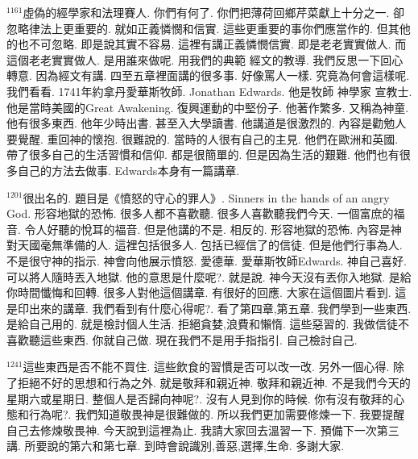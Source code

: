 \documentclass{book}
\begin{document}
$^{1161}$虛偽的經學家和法理賽人.
你們有何了.
你們把薄荷回鄉芹菜獻上十分之一.
卻忽略律法上更重要的.
就如正義憐憫和信實.
這些更重要的事你們應當作的.
但其他的也不可忽略.
即是說其實不容易.
這裡有講正義憐憫信實.
即是老老實實做人.
而這個老老實實做人.
是用誰來做呢.
用我們的典範 經文的教導.
我們反思一下回心轉意.
因為經文有講.
四至五章裡面講的很多事.
好像罵人一樣.
究竟為何會這樣呢.
我們看看.
1741年約拿丹愛華斯牧師.
Jonathan Edwards.
他是牧師 神學家 宣教士.
他是當時美國的Great Awakening.
復興運動的中堅份子.
他著作繁多.
又稱為神童.
他有很多東西.
他年少時出書.
甚至入大學讀書.
他講道是很激烈的.
內容是勸勉人要覺醒.
重回神的懷抱.
很難說的.
當時的人很有自己的主見.
他們在歐洲和英國.
帶了很多自己的生活習慣和信仰.
都是很簡單的.
但是因為生活的艱難.
他們也有很多自己的方法去做事.
Edwards本身有一篇講章.

$^{1201}$很出名的.
題目是《憤怒的守心的罪人》.
Sinners in the hands of an angry God.
形容地獄的恐怖.
很多人都不喜歡聽.
很多人喜歡聽我們今天.
一個富庶的福音.
令人好聽的悅耳的福音.
但是他講的不是.
相反的.
形容地獄的恐怖.
內容是神對天國毫無準備的人.
這裡包括很多人.
包括已經信了的信徒.
但是他們行事為人.
不是很守神的指示.
神會向他展示憤怒.
愛德華.
愛華斯牧師Edwards.
神自己喜好.
可以將人隨時丟入地獄.
他的意思是什麼呢?.
就是說.
神今天沒有丟你入地獄.
是給你時間懺悔和回轉.
很多人對他這個講章.
有很好的回應.
大家在這個圖片看到.
這是印出來的講章.
我們看到有什麼心得呢?.
看了第四章,第五章.
我們學到一些東西.
是給自己用的.
就是檢討個人生活.
拒絕貪婪,浪費和懶惰.
這些惡習的.
我做信徒不喜歡聽這些東西.
你就自己做.
現在我們不是用手指指引.
自己檢討自己.

$^{1241}$這些東西是否不能不買住.
這些飲食的習慣是否可以改一改.
另外一個心得.
除了拒絕不好的思想和行為之外.
就是敬拜和親近神.
敬拜和親近神.
不是我們今天的星期六或星期日.
整個人是否歸向神呢?.
沒有人見到你的時候.
你有沒有敬拜的心態和行為呢?.
我們知道敬畏神是很難做的.
所以我們更加需要修煉一下.
我要提醒自己去修煉敬畏神.
今天說到這裡為止.
我請大家回去溫習一下.
預備下一次第三講.
所要說的第六和第七章.
到時會說識別,善惡,選擇,生命.
多謝大家.
\newpage
\end{document}
